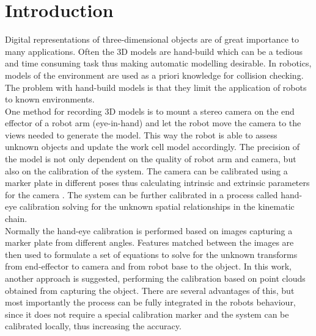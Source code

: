 \chapter{Introduction}
Digital representations of three-dimensional objects are of great importance to many applications. Often the 3D models are hand-build which can be a tedious and time consuming task thus making automatic modelling desirable. In robotics, models of the environment are used as a priori knowledge for collision checking. The problem with hand-build models is that they limit the application of robots to known environments. \\

One method for recording 3D models is to mount a stereo camera on the end effector of a robot arm (eye-in-hand) and let the robot move the camera to the views needed to generate the model. This way the robot is able to assess unknown objects and update the work cell model accordingly. The precision of the model is not only dependent on the quality of robot arm and camera, but also on the calibration of the system. The camera can be calibrated using a marker plate in different poses thus calculating intrinsic and extrinsic parameters for the camera \cite{Zhang2000}. The system can be further calibrated in a process called hand-eye calibration solving for the unknown spatial relationships in the kinematic chain.\\


Normally the hand-eye calibration is performed based on images capturing a marker plate from different angles. Features matched between the images are then used to formulate a set of equations to solve for the unknown transforms from end-effector to camera and from robot base to the object. In this work, another approach is suggested, performing the calibration based on point clouds obtained from capturing the object. There are several advantages of this, but most importantly the process can be fully integrated in the robots behaviour, since it does not require a special calibration marker and the system can be calibrated locally, thus increasing the accuracy.\\

